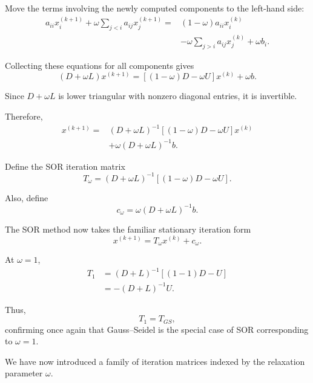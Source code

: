 \documentclass[11pt,a4paper]{article}
\theoremstyle{definition}
\theoremstyle{remark}
\begin{document}
Move the terms involving
the newly computed components
to the left-hand side:
\[
\begin{aligned}
a_{ii}x_i^{(k+1)}
+
\omega\sum_{j<i}
a_{ij}x_j^{(k+1)}
={}&
(1-\omega)a_{ii}x_i^{(k)}
\\
&-
\omega\sum_{j>i}
a_{ij}x_j^{(k)}
+\omega b_i.
\end{aligned}
\]

Collecting these equations
for all components gives
\begin{equation}
    (D+\omega L)x^{(k+1)}
    =
    \left[(1-\omega)D-\omega U\right]
    x^{(k)}
    +
    \omega b.
    \label{eq:sor_matrix_intermediate}
\end{equation}

Since $D+\omega L$ is lower
triangular with nonzero
diagonal entries, it is
invertible.

Therefore,
\begin{equation}
\boxed{
\begin{aligned}
x^{(k+1)}
={}&
(D+\omega L)^{-1}
\left[(1-\omega)D-\omega U\right]
x^{(k)}
\\
&+
\omega(D+\omega L)^{-1}b.
\end{aligned}
}
\label{eq:sor_matrix}
\end{equation}

Define the SOR iteration matrix
\begin{equation}
\boxed{
T_{\omega}
=
(D+\omega L)^{-1}
\left[(1-\omega)D-\omega U\right].
}
\label{eq:sor_iteration_matrix}
\end{equation}

Also, define
\[
    c_{\omega}
    =
    \omega(D+\omega L)^{-1}b.
\]

The SOR method now takes
the familiar stationary
iteration form
\begin{equation}
    \boxed{
    x^{(k+1)}
    =
    T_{\omega}x^{(k)}
    +
    c_{\omega}.
    }
    \label{eq:sor_compact}
\end{equation}

At $\omega=1$,
\[
\begin{aligned}
T_1
&=
(D+L)^{-1}
\left[(1-1)D-U\right]
\\
&=
-(D+L)^{-1}U.
\end{aligned}
\]

Thus,
\[
    \boxed{
    T_1=T_{GS},
    }
\]
confirming once again that
Gauss--Seidel is the special
case of SOR corresponding
to $\omega=1$.

We have now introduced a
family of iteration matrices
indexed by the relaxation
parameter $\omega$.
\end{document}
